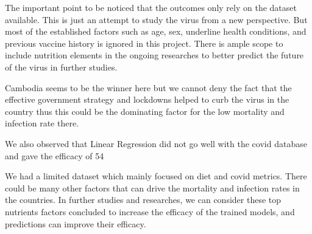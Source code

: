 \documentclass[journal,twoside,web]{ieeecolor}
\begin{document}
The important point to be noticed that the outcomes only rely on the dataset available. This is just an attempt to study the virus from a new perspective. But most of the established factors such as age, sex, underline health conditions, and previous vaccine history is ignored in this project. There is ample scope to include nutrition elements in the ongoing researches to better predict the future of the virus in further studies.

Cambodia seems to be the winner here but we cannot deny the fact that the effective government strategy and lockdowns helped to curb the virus in the country thus this could be the dominating factor for the low mortality and infection rate there.

We also observed that Linear Regression did not go well with the covid database and gave the efficacy of 54%

We had a limited dataset which mainly focused on diet and covid metrics. There could be many other factors that can drive the mortality and infection rates in the countries. In further studies and researches, we can consider these top nutrients factors concluded to increase the efficacy of the trained models, and predictions can improve their efficacy. 

\printbibliography
\end{document}
